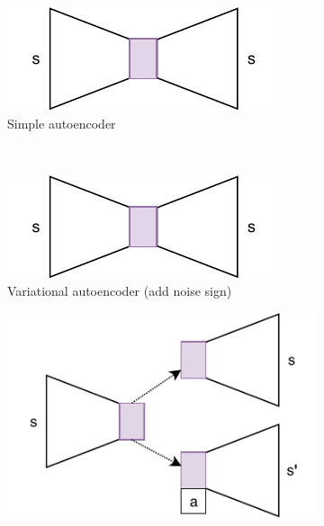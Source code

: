 \begin{figure}[ht!]
	\centering
	\begin{subfigure}{0.45\columnwidth}
		\centering
		\includegraphics[width=\linewidth]{../img/very_simple_autoencoder.pdf}
		\caption{Simple autoencoder}
		\label{subfig:repr_learner_simple_autoencoder}
	\end{subfigure}%
	~ 
	\begin{subfigure}{0.45\columnwidth}
		\centering
		\includegraphics[width=\linewidth]{../img/very_simple_autoencoder.pdf}
		\caption{Variational autoencoder (add noise sign)}
		\label{subfig:repr_learner_vae}
	\end{subfigure}
	\begin{subfigure}{0.5\columnwidth}
		\centering
		\includegraphics[width=\linewidth]{../img/janus.pdf}

\end{subfigure}
\end{figure}

